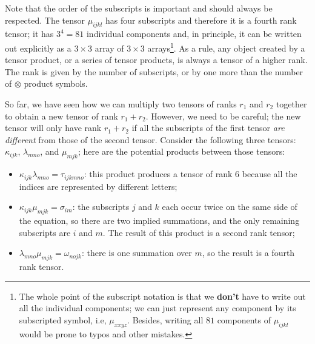 Note that the order of the subscripts is important and should always be respected. The tensor $\mu_{ijkl}$ has four subscripts and therefore it is a fourth rank tensor; it has $3^4=81$ individual components and, in principle, it can be written out explicitly as a $3\times 3$ array of $3\times 3$ arrays\footnote{The whole point of the subscript notation is that we \textbf{don't} have to write out all the individual components; we can just represent any component by its subscripted symbol, i.e, $\mu_{xxyz}$. Besides, writing all $81$ components of $\mu_{ijkl}$ would be prone to typos and other mistakes.}.  As a rule, any object created by a tensor product, or a series of tensor products, is always a tensor of a higher rank.  The rank is given by the number of subscripts, or by one more than the number of $\otimes$ product symbols.

So far, we have seen how we can multiply two tensors of ranks $r_1$ and $r_2$ together to obtain a new tensor of rank $r_1+r_2$.  However, we need to be careful; the new tensor will only have rank $r_1+r_2$ if all the subscripts of the first tensor \textit{are different} from those of the second tensor.  Consider the following three tensors: $\kappa_{ijk}$, $\lambda_{mno}$, and $\mu_{mjk}$; here are the potential products between those tensors:
\begin{itemize}
\item $\kappa_{ijk}\lambda_{mno} = \tau_{ijkmno}$: this product produces a tensor of rank $6$ because all the indices are represented by different letters;
\item $\kappa_{ijk}\mu_{mjk} = \sigma_{im}$: the subscripts $j$ and $k$ each occur twice on the same side of the equation, so there are two implied summations, and the only remaining subscripts are $i$ and $m$.  The result of this product is a second rank tensor;
\item $\lambda_{mno}\mu_{mjk}=\omega_{nojk}$: there is one summation over $m$, so the result is a fourth rank tensor.\\
\end{itemize}

